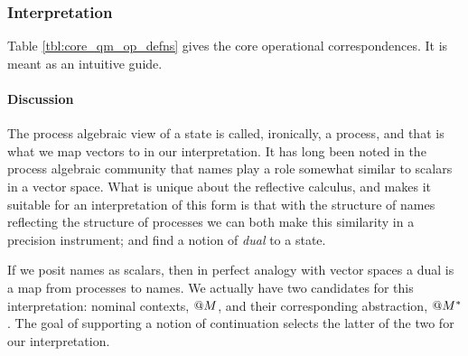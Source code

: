 \subsubsection{Interpretation}

Table \ref{tbl:core_qm_op_defns} gives the core operational
correspondences. It is meant as an intuitive guide.

\begin{table}[htp]\label{tbl:core_qm_op_defns}
  \caption{QM - operational definitions}
\end{table}

\paragraph{Discussion}
The process algebraic view of a state is called, ironically, a
process, and that is what we map vectors to in our interpretation. It
has long been noted in the process algebraic community that names play
a role somewhat similar to scalars in a vector space. What is unique
about the reflective calculus, and makes it suitable for an
interpretation of this form is that with the structure of names
reflecting the structure of processes we can both make this similarity
in a precision instrument; and find a notion of \emph{dual} to a
state. 

If we posit names as scalars, then in perfect analogy with vector
spaces a dual is a map from processes to names. We actually have two
candidates for this interpretation: nominal contexts, $\mathsf{@} M$,
and their corresponding abstraction, $\mathsf{@} M^{*}$. The goal of
supporting a notion of continuation selects the latter of the two for
our interpretation.

